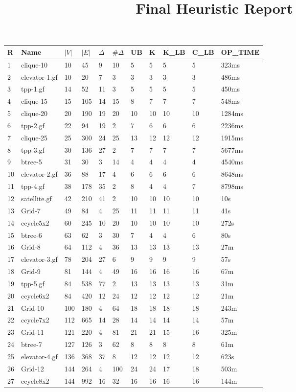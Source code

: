 \documentclass{article}
\title{Final Heuristic Report}
\begin{document}
\maketitle

\begin{longtable}{|l |l |l |l |l |l |l |l |l |l |l |}
\hline
R&Name&$|V|$&$|E|$&$\Delta$&$\# \Delta$&UB&K&K\_LB&C\_LB&OP\_TIME\\
\hline
1&clique-10&10&45&9&10&5&5&5&5&323ms\\
2&elevator-1.gf&10&20&7&3&3&3&3&3&486ms\\
3&tpp-1.gf&14&52&11&3&5&5&5&5&450ms\\
4&clique-15&15&105&14&15&8&7&7&7&548ms\\
5&clique-20&20&190&19&20&10&10&10&10&1284ms\\
6&tpp-2.gf&22&94&19&2&7&6&6&6&2236ms\\
7&clique-25&25&300&24&25&13&12&12&12&1915ms\\
8&tpp-3.gf&30&136&27&2&7&7&7&7&5677ms\\
9&btree-5&31&30&3&14&4&4&4&4&4540ms\\
10&elevator-2.gf&36&88&17&4&6&6&6&6&8648ms\\
11&tpp-4.gf&38&178&35&2&8&4&4&7&8798ms\\
12&satellite.gf&42&210&41&2&10&10&10&10&10s\\
13&Grid-7&49&84&4&25&11&11&11&11&41s\\
14&ccycle5x2&60&245&10&20&10&10&10&10&272s\\
15&btree-6&63&62&3&30&7&4&4&6&80s\\
16&Grid-8&64&112&4&36&13&13&13&13&27m\\
17&elevator-3.gf&78&204&27&6&9&9&9&9&57s\\
18&Grid-9&81&144&4&49&16&16&16&16&67m\\
19&tpp-5.gf&84&538&77&2&13&13&13&13&31m\\
20&ccycle6x2&84&420&12&24&12&12&12&12&21m\\
21&Grid-10&100&180&4&64&18&18&18&18&243m\\
22&ccycle7x2&112&665&14&28&14&14&14&14&57m\\
23&Grid-11&121&220&4&81&21&21&15&16&325m\\
24&btree-7&127&126&3&62&8&8&8&8&61m\\
25&elevator-4.gf&136&368&37&8&12&12&12&12&623s\\
26&Grid-12&144&264&4&100&24&24&17&18&503m\\
27&ccycle8x2&144&992&16&32&16&16&16&16&144m\\

\end{longtable}
\end{document}
